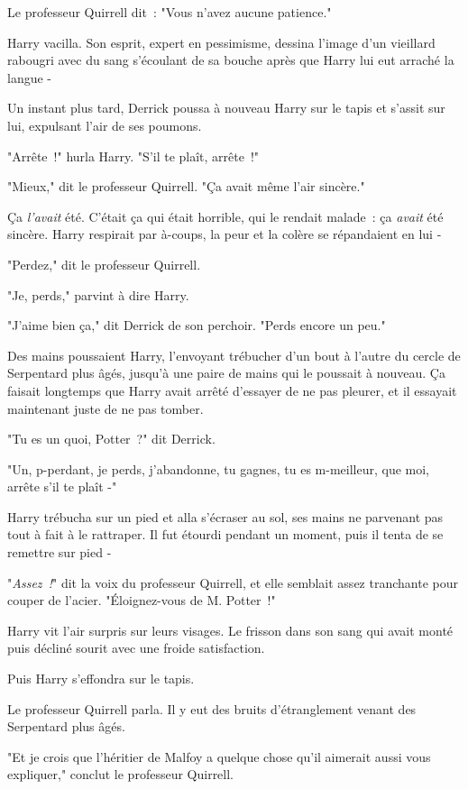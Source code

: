 Le professeur Quirrell dit~: "Vous n'avez aucune patience."

Harry vacilla. Son esprit, expert en pessimisme, dessina l'image d'un vieillard rabougri avec du sang s'écoulant de sa bouche après que Harry lui eut arraché la langue -

Un instant plus tard, Derrick poussa à nouveau Harry sur le tapis et s'assit sur lui, expulsant l'air de ses poumons.

"Arrête~!" hurla Harry. "S'il te plaît, arrête~!"

"Mieux," dit le professeur Quirrell. "Ça avait même l'air sincère."

Ça \emph{l'avait} été. C'était ça qui était horrible, qui le rendait malade~: ça \emph{avait} été sincère. Harry respirait par à-coups, la peur et la colère se répandaient en lui -

"Perdez," dit le professeur Quirrell.

"Je, perds," parvint à dire Harry.

"J'aime bien ça," dit Derrick de son perchoir. "Perds encore un peu."

\later

Des mains poussaient Harry, l'envoyant trébucher d'un bout à l'autre du cercle de Serpentard plus âgés, jusqu'à une paire de mains qui le poussait à nouveau. Ça faisait longtemps que Harry avait arrêté d'essayer de ne pas pleurer, et il essayait maintenant juste de ne pas tomber.

"Tu es un quoi, Potter~?" dit Derrick.

"Un, p-perdant, je perds, j'abandonne, tu gagnes, tu es m-meilleur, que moi, arrête s'il te plaît -"

Harry trébucha sur un pied et alla s'écraser au sol, ses mains ne parvenant pas tout à fait à le rattraper. Il fut étourdi pendant un moment, puis il tenta de se remettre sur pied -

"\emph{Assez~!}" dit la voix du professeur Quirrell, et elle semblait assez tranchante pour couper de l'acier. "Éloignez-vous de M. Potter~!"

Harry vit l'air surpris sur leurs visages. Le frisson dans son sang qui avait monté puis décliné sourit avec une froide satisfaction.

Puis Harry s'effondra sur le tapis.

Le professeur Quirrell parla. Il y eut des bruits d'étranglement venant des Serpentard plus âgés.

"Et je crois que l'héritier de Malfoy a quelque chose qu'il aimerait aussi vous expliquer," conclut le professeur Quirrell.


